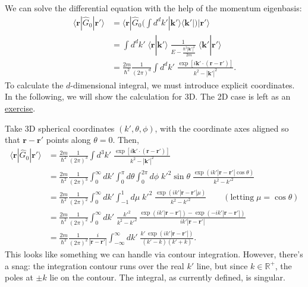 \documentclass[pra,12pt]{revtex4}
\begin{document}
We can solve the differential equation with the help of the momentum
eigenbasis:
\begin{align}
  \langle\mathbf{r}|\hat{G}_0|\mathbf{r}'\rangle
  &= \langle\mathbf{r}|\hat{G}_0 \Big(\int d^dk' |\mathbf{k}'\rangle\langle\mathbf{k}'| \Big) |\mathbf{r}'\rangle \nonumber \\
  &= \int d^dk' \; \langle\mathbf{r}|\mathbf{k}'\rangle \;
  \frac{1}{E-\frac{\hbar^2|\mathbf{k}'|^2}{2m}} \;
  \langle\mathbf{k}'|\mathbf{r}'\rangle \nonumber \\
  &= \frac{2m}{\hbar^2} \frac{1}{(2\pi)^d} \int d^dk' \;
  \frac{\exp\left[i\mathbf{k}' \cdot
      (\mathbf{r}-\mathbf{r}')\right]}{k^2-|\mathbf{k}'|^2}.
  \label{rGr}
\end{align}
To calculate the $d$-dimensional integral, we must introduce explicit
coordinates.  In the following, we will show the calculation for 3D.
The 2D case is left as an \hyperref[ex:2dpropagator]{exercise}.

Take 3D spherical coordinates $(k',\theta,\phi)$, with the coordinate
axes aligned so that $\mathbf{r}-\mathbf{r}'$ points along $\theta=0$.
Then,
\begin{align}
  \langle\mathbf{r}|\hat{G}_0|\mathbf{r}'\rangle &= \frac{2m}{\hbar^2} \frac{1}{(2\pi)^3} \int d^3k' \; \frac{\exp\left[i\mathbf{k}'\cdot (\mathbf{r}-\mathbf{r}')\right]}{k^2-|\mathbf{k}'|^2} \nonumber \\
  &= \frac{2m}{\hbar^2} \frac{1}{(2\pi)^3} \int_0^\infty dk' \int_0^\pi d\theta \int_{0}^{2\pi} d\phi \;{k'}^{2}\sin\theta\; \frac{\displaystyle \exp\left(ik'|\mathbf{r}-\mathbf{r}'|\cos\theta\right)}{k^2-{k'}^2} \nonumber \\
  &= \frac{2m}{\hbar^2} \frac{1}{(2\pi)^2} \int_0^\infty dk' \int_{-1}^1 d\mu \;{k'}^2\; \frac{\displaystyle \exp\left(ik'|\mathbf{r}-\mathbf{r}'|\mu\right)}{k^2-{k'}^2} \qquad(\text{letting}\;\mu = \cos\theta) \nonumber \\
  &= \frac{2m}{\hbar^2} \frac{1}{(2\pi)^2} \int_0^\infty dk' \; \frac{ {k'}^2}{k^2-{k'}^2}\, \frac{\displaystyle \exp\left(ik'|\mathbf{r}-\mathbf{r}'|\right) - \exp\left(-ik'|\mathbf{r}-\mathbf{r}'|\right)}{ik'|\mathbf{r}-\mathbf{r}'|} \nonumber\\
  &= \frac{2m}{\hbar^2} \frac{1}{(2\pi)^2} \frac{i}{|\mathbf{r}-\mathbf{r}'|} \int_{-\infty}^\infty dk' \; \frac{\displaystyle k'\, \exp\left(ik'|\mathbf{r}-\mathbf{r}'|\right)}{(k' - k)(k'+k)}.
  \label{rGrintegrand}
\end{align}
This looks like something we can handle via contour integration.
However, there's a snag: the integration contour runs over the real
$k'$ line, but since $k \in \mathbb{R}^+$, the poles at $\pm k$ lie on
the contour.  The integral, as currently defined, is singular.
\end{document}
